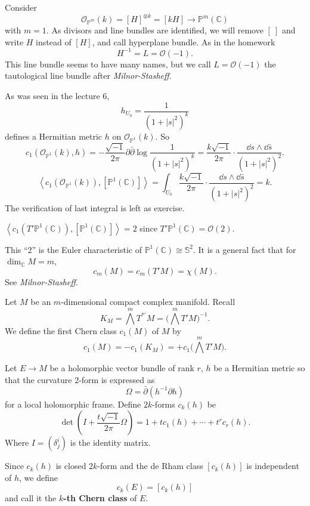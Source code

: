 \documentclass[12pt]{article}
\begin{document}
\begin{example}
  Consider \[
    \mathcal{O}_{\mathbb{P}^m}(k)=[H]^{\otimes k}=[kH]\to \mathbb{P}^m(\mathbb{C})
  \] with \(m=1\). As divisors and line bundles are identified, we will remove
  \([\ ]\) and write \(H\) instead of \([H]\), and call hyperplane bundle. As in the
  homework \[
    H^{-1}=L=\mathcal{O}(-1)
  .\] This line bundle seems to have many names, but we call \(L=\mathcal{O}(-1)\)
  the tautological line bundle after \emph{Milnor-Stasheff}.

  As was seen in the lecture 6, \[
    h_{U_0}=\frac{1}{(1+|s|^2)^k}
  \] defines a Hermitian metric \(h\) on \(\mathcal{O}_{\mathbb{P}^1}(k)\). So \[
    c_1(\mathcal{O}_{\mathbb{P}^1}(k),h)=-\frac{\sqrt{-1}}{2\pi}\partial\bar{\partial}
    \log \frac{1}{(1+|s|^2)^k}
    =\frac{k\sqrt{-1}}{2\pi}\cdot \frac{\dd{s}\wedge \dd{\bar{s}}}{(1+|s|^2)^2}
  .\] \[
    \left<c_1(\mathcal{O}_{\mathbb{P}^1}(k)),[\mathbb{P}^1(\mathbb{C})]\right> 
    =\int_{U_0}\frac{k\sqrt{-1}}{2\pi}\cdot\frac{\dd{s}\wedge\dd{\bar{s}}}{(1+|s|^2)^2}
    =k
  .\]
  The verification of last integral is left as exercise.
\end{example}

\begin{corollary}
  \(\left<c_1(T'\mathbb{P}^1(\mathbb{C})),[\mathbb{P}^1(\mathbb{C})]\right> =2\)
  since \(T'\mathbb{P}^1(\mathbb{C})=\mathcal{O}(2)\).
\end{corollary}

\begin{remark}
  This ``2'' is the Euler characteristic of \(\mathbb{P}^1(\mathbb{C})\cong
  \mathbb{S}^2\). It is a general fact that for \(\dim_{\mathbb{C}}M=m\), \[
    c_m(M)=c_m(T'M)=\chi(M)
  .\] See \emph{Milnor-Stasheff}.
\end{remark}

\begin{definition}
  Let \(M\) be an \(m\)-dimensional compact complex manifold. Recall \[
    K_M=\bigwedge^m T^{*\prime}M=\Big(\bigwedge^m T'M\Big)^{-1}
  .\] We define the first Chern class \(c_1(M)\) of \(M\) by \[
    c_1(M)=-c_1(K_M)=+c_1\Big(\bigwedge^m T'M\Big)
  .\] 
\end{definition}

\begin{definition}
  Let \(E\to M\) be a holomorphic vector bundle of rank \(r\), \(h\) be a Hermitian
  metric so that the curvature 2-form is expressed as \[
    \Omega=\bar{\partial}(h^{-1}\partial h)
  \] for a local holomorphic frame. Define \(2k\)-forms \(c_k(h)\) be \[
    \det(I+\frac{t\sqrt{-1}}{2\pi}\Omega)=1+tc_1(h)+\cdots +t^r c_r(h)
  .\] Where \(I=(\delta^i_j)\) is the identity matrix.
  
  Since \(c_k(h)\) is closed \(2k\)-form and the de Rham class \([c_k(h)]\) is
  independent of \(h\), we define \[
    c_k(E)=[c_k(h)]
  \] and call it the \textbf{\(k\)-th Chern class} of \(E\).
\end{definition}
\end{document}
